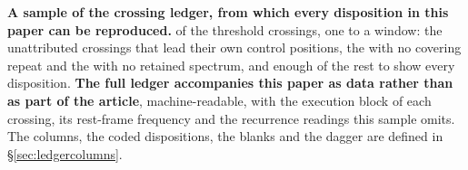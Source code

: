 \begin{table}
\centering
\caption{\textbf{A sample of the crossing ledger, from which every
disposition in this paper can be reproduced.} \SiLdgSampN{} of the
\EvNCrossRaw{} threshold crossings, one to a window: the \EvNRankQp{}
unattributed crossings that
lead their own control positions, the \MkAttrUntest{} with no covering repeat
and the \CnNNoSpecWord{} with no retained spectrum, and enough of the rest to
show every disposition. \textbf{The full ledger accompanies this
paper as data rather than as part of the article}, machine-readable, with the
execution block of each crossing, its rest-frame frequency and the recurrence
readings this sample omits. The
columns, the coded dispositions, the blanks and the
dagger are defined in \S\ref{sec:ledgercolumns}.}
\label{tab:ledger}
\scriptsize

\end{table}

